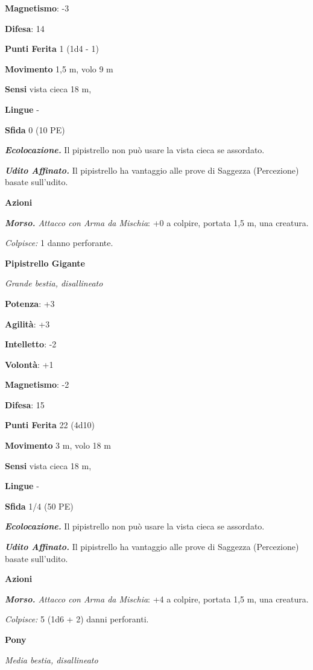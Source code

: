 \begin{multicols}{2}
\textbf{Magnetismo}: -3

\textbf{Difesa}: 14

\textbf{Punti Ferita} 1 (1d4 - 1)

\textbf{Movimento} 1,5 m, volo 9 m

\textbf{Sensi} vista cieca 18 m, 

\textbf{Lingue} -

\textbf{Sfida} 0 (10 PE)

\emph{\textbf{Ecolocazione.}} Il pipistrello non può usare la vista
cieca se assordato.

\emph{\textbf{Udito Affinato.}} Il pipistrello ha vantaggio alle prove
di Saggezza (Percezione) basate sull'udito.

\textbf{Azioni}

\emph{\textbf{Morso.} Attacco con Arma da Mischia}: +0 a colpire,
portata 1,5 m, una creatura.

\emph{Colpisce:} 1 danno perforante.

\textbf{Pipistrello Gigante}

\emph{Grande bestia, disallineato}

\textbf{Potenza}: +3

\textbf{Agilità}: +3

\textbf{Intelletto}: -2

\textbf{Volontà}: +1

\textbf{Magnetismo}: -2

\textbf{Difesa}: 15

\textbf{Punti Ferita} 22 (4d10)

\textbf{Movimento} 3 m, volo 18 m

\textbf{Sensi} vista cieca 18 m, 

\textbf{Lingue} -

\textbf{Sfida} 1/4 (50 PE)

\emph{\textbf{Ecolocazione.}} Il pipistrello non può usare la vista
cieca se assordato.

\emph{\textbf{Udito Affinato.}} Il pipistrello ha vantaggio alle prove
di Saggezza (Percezione) basate sull'udito.

\textbf{Azioni}

\emph{\textbf{Morso.} Attacco con Arma da Mischia}: +4 a colpire,
portata 1,5 m, una creatura.

\emph{Colpisce:} 5 (1d6 + 2) danni perforanti.

\textbf{Pony}

\emph{Media bestia, disallineato}


\end{multicols}

